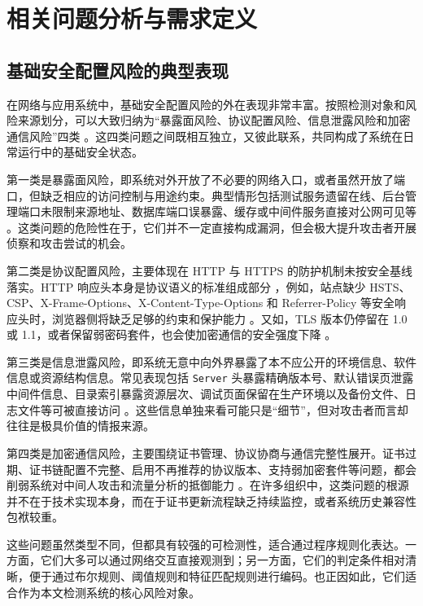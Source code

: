 \documentclass[12pt,a4paper,fontset=none]{ctexart}
\begin{document}
\section{相关问题分析与需求定义}

\subsection{基础安全配置风险的典型表现}

在网络与应用系统中，基础安全配置风险的外在表现非常丰富。按照检测对象和风险来源划分，可以大致归纳为“暴露面风险、协议配置风险、信息泄露风险和加密通信风险”四类 \cite{owasp-top10,wstg,nist-server,cis-benchmarks}。这四类问题之间既相互独立，又彼此联系，共同构成了系统在日常运行中的基础安全状态。

第一类是暴露面风险，即系统对外开放了不必要的网络入口，或者虽然开放了端口，但缺乏相应的访问控制与用途约束。典型情形包括测试服务遗留在线、后台管理端口未限制来源地址、数据库端口误暴露、缓存或中间件服务直接对公网可见等 \cite{shodan,redis-security,mysql-security,nmap-book}。这类问题的危险性在于，它们并不一定直接构成漏洞，但会极大提升攻击者开展侦察和攻击尝试的机会。

第二类是协议配置风险，主要体现在 HTTP 与 HTTPS 的防护机制未按安全基线落实。HTTP 响应头本身是协议语义的标准组成部分 \cite{rfc9110}，例如，站点缺少 HSTS、CSP、X-Frame-Options、X-Content-Type-Options 和 Referrer-Policy 等安全响应头时，浏览器侧将缺乏足够的约束和保护能力 \cite{rfc6797,csp,xcto,referrer-policy,clickjacking}。又如，TLS 版本仍停留在 1.0 或 1.1，或者保留弱密码套件，也会使加密通信的安全强度下降 \cite{rfc8446,tls-bcp,mozilla-tls,owasp-tls}。

第三类是信息泄露风险，即系统无意中向外界暴露了本不应公开的环境信息、软件信息或资源结构信息。常见表现包括 \texttt{Server} 头暴露精确版本号、默认错误页泄露中间件信息、目录索引暴露资源层次、调试页面保留在生产环境以及备份文件、日志文件等可被直接访问 \cite{wstg,owasp-cheatsheet,apache-security,nginx-security}。这些信息单独来看可能只是“细节”，但对攻击者而言却往往是极具价值的情报来源。

第四类是加密通信风险，主要围绕证书管理、协议协商与通信完整性展开。证书过期、证书链配置不完整、启用不再推荐的协议版本、支持弱加密套件等问题，都会削弱系统对中间人攻击和流量分析的抵御能力 \cite{rfc8446,tls-bcp,nist-crypto,cert-guide}。在许多组织中，这类问题的根源并不在于技术实现本身，而在于证书更新流程缺乏持续监控，或者系统历史兼容性包袱较重。

这些问题虽然类型不同，但都具有较强的可检测性，适合通过程序规则化表达。一方面，它们大多可以通过网络交互直接观测到；另一方面，它们的判定条件相对清晰，便于通过布尔规则、阈值规则和特征匹配规则进行编码。也正因如此，它们适合作为本文检测系统的核心风险对象。
\end{document}
